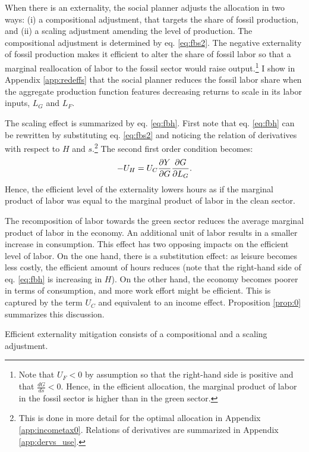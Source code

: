 When there is an externality, the social planner adjusts the allocation in two ways: (i) a compositional adjustment, that targets the share of fossil production, and (ii) a scaling adjustment amending the level of production. 
The compositional adjustment is determined by eq. \eqref{eq:fbs2}.
The negative externality of fossil production makes it efficient to alter the share of fossil labor so that  a marginal reallocation of labor to the fossil sector would raise output.\footnote{ Note that $U_F<0$ by assumption so that the right-hand side is positive and that $\frac{dG}{ds}<0$. Hence,  in the efficient allocation, the marginal product of labor in the fossil sector is higher than in the green sector.} %
I show in Appendix \ref{app:redeffs} that the social planner reduces the fossil labor share when the aggregate production function features decreasing returns to scale in its labor inputs, $L_G$ and $L_F$.


The scaling effect is summarized by eq. \eqref{eq:fbh}.
First note that eq. \eqref{eq:fbh} can be rewritten by substituting eq. \eqref{eq:fbs2} and noticing the relation of derivatives with respect to $H$ and $s$.\footnote{ This is done in more detail for the optimal allocation in Appendix \ref{app:incometax0}. Relations of derivatives are summarized in Appendix \ref{app:dervs_use}.}  
The second first order condition becomes:
\begin{align}\label{eq:fbh_simp}
-U_H=U_C\frac{\partial Y}{\partial G}\frac{\partial{G}}{\partial{L_G}}.
\end{align}
Hence, the efficient level of the externality lowers hours as if the marginal product of labor was equal to the marginal product of labor in the clean sector.

The recomposition of labor towards the  green sector reduces the average marginal product of labor in the economy. An additional unit of labor results in a smaller increase in consumption.  This effect has two opposing impacts on the efficient level of labor. On the one hand, there is a substitution effect: as leisure becomes less costly, the efficient amount of hours reduces (note that the right-hand side of eq. \eqref{eq:fbh} is increasing in $H$). On the other hand, the economy becomes poorer in terms of consumption, and more work effort might be efficient. This is captured by the term $U_C$ and equivalent to an income effect. 
Proposition \ref{prop:0} summarizes this discussion.
\begin{prop}\label{prop:0}
	Efficient externality mitigation consists of a compositional and a scaling adjustment. 
\end{prop}


